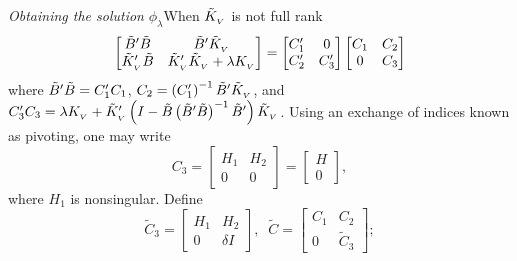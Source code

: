 \begin{frame}{\textit{Obtaining the solution}  $\phi_\lambda$}{When $\tilde{K}_{_{V}}$ is not full rank}
\footnotesize
\begin{equation} \label{eq:normal-equation-cholesky}
\begin{bmatrix}
\tilde{B}'\tilde{B} & \tilde{B}'\tilde{K}_{_{ V}} \\
\tilde{K}_{_{ V}}'\tilde{B} & \tilde{K}_{_{ V}}'\tilde{K}_{_{ V}} + \lambda K_{_{ V}}\\
\end{bmatrix}
= \begin{bmatrix}
C'_1 & 0 \\
C'_2  & C'_3 
\end{bmatrix}
\begin{bmatrix}
C_1 & C_2 \\
0  & C_3 
\end{bmatrix}
\end{equation}
\noindent
where $\tilde{B}'\tilde{B} = C'_1 C_1$, $C_2 = \left(C'_1\right)^{-1} \tilde{B}' \tilde{K}_{_{ V}}$, and $C'_3 C_3 = \lambda K_{_{ V}} +  \tilde{K}_{_{ V}}'\left( I - \tilde{B}\left( \tilde{B}' \tilde{B} \right)^{-1} \tilde{B}' \right)\tilde{K}_{_{ V}}$. Using an exchange of indices known as pivoting, one may write 
\begin{equation*}
C_3 = \begin{bmatrix} H_1 & H_2 \\ 0 & 0 \end{bmatrix} = \begin{bmatrix} H \\  0 \end{bmatrix},
\end{equation*}
\noindent
where $H_1$ is nonsingular. Define
\begin{equation} \label{eq:cholesky-factor-mod}
\tilde{C}_3 = \begin{bmatrix}
H_1 & H_2 \\
0  & \delta I 
\end{bmatrix}, \;\;
\tilde{C} = \begin{bmatrix}
C_1 & C_2 \\
0  & \tilde{C}_3 
\end{bmatrix};
\end{equation}
\end{frame}

